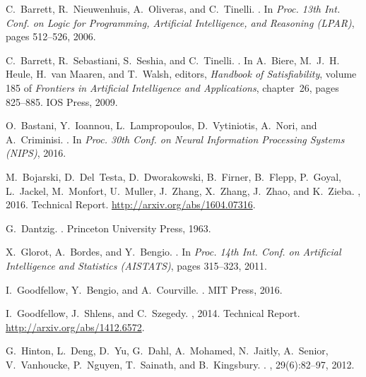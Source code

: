 \documentclass[a4paper]{llncs}
\begin{document}
{

%

\begin{thebibliography}{10}

C.~Barrett, R.~Nieuwenhuis, A.~Oliveras, and C.~Tinelli.
.
\newblock In {\em Proc. 13th Int. Conf. on Logic for Programming, Artificial
  Intelligence, and Reasoning (LPAR)}, pages 512--526, 2006.

C.~Barrett, R.~Sebastiani, S.~Seshia, and C.~Tinelli.
.
\newblock In A.~Biere, M.~J.~H. Heule, H.~van Maaren, and T.~Walsh, editors,
  {\em Handbook of Satisfiability}, volume 185 of {\em Frontiers in Artificial
  Intelligence and Applications}, chapter~26, pages 825--885. IOS Press, 2009.

O.~Bastani, Y.~Ioannou, L.~Lampropoulos, D.~Vytiniotis, A.~Nori, and
  A.~Criminisi.
.
\newblock In {\em Proc. 30th Conf. on Neural Information Processing Systems
  (NIPS)}, 2016.

M.~Bojarski, D.~Del~Testa, D.~Dworakowski, B.~Firner, B.~Flepp, P.~Goyal,
  L.~Jackel, M.~Monfort, U.~Muller, J.~Zhang, X.~Zhang, J.~Zhao, and K.~Zieba.
, 2016.
\newblock Technical Report. \url{http://arxiv.org/abs/1604.07316}.

G.~Dantzig.
.
\newblock Princeton University Press, 1963.

X.~Glorot, A.~Bordes, and Y.~Bengio.
.
\newblock In {\em Proc. 14th Int. Conf. on Artificial Intelligence and
  Statistics (AISTATS)}, pages 315--323, 2011.

I.~Goodfellow, Y.~Bengio, and A.~Courville.
.
\newblock MIT Press, 2016.

I.~Goodfellow, J.~Shlens, and C.~Szegedy.
, 2014.
\newblock Technical Report. \url{http://arxiv.org/abs/1412.6572}.

G.~Hinton, L.~Deng, D.~Yu, G.~Dahl, A.~Mohamed, N.~Jaitly, A.~Senior,
  V.~Vanhoucke, P.~Nguyen, T.~Sainath, and B.~Kingsbury.
.
, 29(6):82--97, 2012.


\end{thebibliography}}
\end{document}
